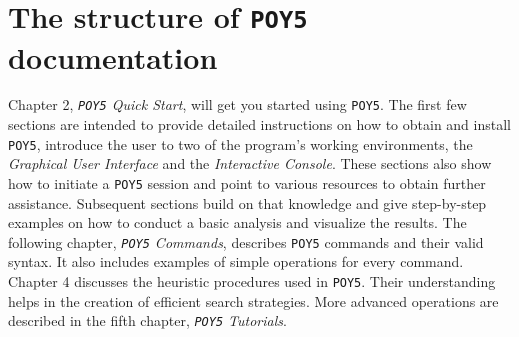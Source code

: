 \documentclass[11pt]{book}
\newcommand{\commandstyle}[1]{\texttt{#1}}
\newcommand{\poy}{\commandstyle{POY5}\xspace}
\begin{document}
\section{The structure of \poy documentation}
Chapter 2, \emph{\poy Quick Start}, will get you started using \poy. The first few sections 
are intended to provide detailed instructions on how to obtain and install \poy, introduce 
the user to two of the program's working environments, the \emph{Graphical User Interface} 
and the \emph{Interactive Console}. These sections also show how to initiate a \poy 
session and point to various resources to obtain further assistance. Subsequent 
sections build on that knowledge and give step-by-step examples on how to conduct 
a basic analysis and visualize the results. The following chapter, \emph{\poy Commands}, 
describes \poy commands and their valid syntax. It also includes examples of simple operations 
for every command. Chapter 4 discusses the heuristic procedures used in \poy. Their 
understanding helps in the creation of efficient search strategies. More advanced operations 
are described in the fifth chapter, \emph{\poy Tutorials}. 
\end{document}
